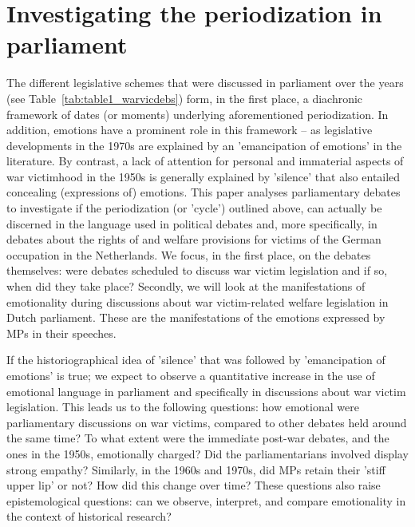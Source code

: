 \documentclass{dhbenelux}
\begin{document}
\section{Investigating the periodization in parliament}
The different legislative schemes that were discussed in parliament over the years (see Table~\ref{tab:table1_warvicdebs}) form, in the first place, a diachronic framework of dates (or moments) underlying aforementioned periodization. In addition, emotions have a prominent role in this framework – as legislative developments in the 1970s are explained by an 'emancipation of emotions' in the literature. By contrast, a lack of attention for personal and immaterial aspects of war victimhood in the 1950s is generally explained by 'silence' that also entailed concealing (expressions of) emotions. This paper analyses parliamentary debates to investigate if the periodization (or 'cycle') outlined above, can actually be discerned in the language used in political debates and, more specifically, in debates about the rights of and welfare provisions for victims of the German occupation in the Netherlands. We focus, in the first place, on the debates themselves: were debates scheduled to discuss war victim legislation and if so, when did they take place? Secondly, we will look at the manifestations of emotionality during discussions about war victim-related welfare legislation in Dutch parliament. These are the manifestations of the emotions expressed by MPs in their speeches.

If the historiographical idea of 'silence' that was followed by 'emancipation of emotions' is true; we expect to observe a quantitative increase in the use of emotional language in parliament and specifically in discussions about war victim legislation. This leads us to the following questions: how emotional were parliamentary discussions on war victims, compared to other debates held around the same time? To what extent were the immediate post-war debates, and the ones in the 1950s, emotionally charged? Did the parliamentarians involved display strong empathy? Similarly, in the 1960s and 1970s, did MPs retain their 'stiff upper lip' or not? How did this change over time? These questions also raise epistemological questions: can we observe, interpret, and compare emotionality in the context of historical research?
	
\end{document}
